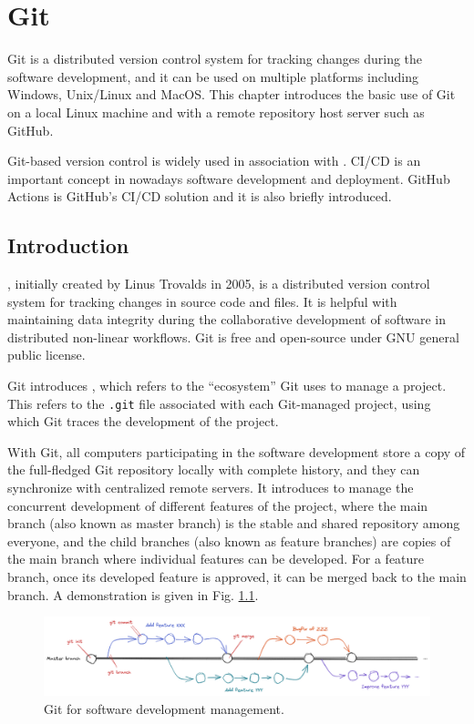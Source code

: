 \chapter{Git} \label{ch:git}

Git is a distributed version control system for tracking changes during the software development, and it can be used on multiple platforms including Windows, Unix/Linux and MacOS. This chapter introduces the basic use of Git on a local Linux machine and with a remote repository host server such as GitHub. 

Git-based version control is widely used in association with . CI/CD is an important concept in nowadays software development and deployment. GitHub Actions is GitHub's CI/CD solution and it is also briefly introduced.

\section{Introduction}

, initially created by Linus Trovalds in 2005, is a distributed version control system for tracking changes in source code and files. It is helpful with maintaining data integrity during the collaborative development of software in distributed non-linear workflows. Git is free and open-source under GNU general public license.

Git introduces , which refers to the ``ecosystem'' Git uses to manage a project. This refers to the \verb|.git| file associated with each Git-managed project, using which Git traces the development of the project. 

With Git, all computers participating in the software development store a copy of the full-fledged Git repository locally with complete history, and they can synchronize with centralized remote servers. It introduces  to manage the concurrent development of different features of the project, where the main branch (also known as master branch) is the stable and shared repository among everyone, and the child branches (also known as feature branches) are copies of the main branch where individual features can be developed. For a feature branch, once its developed feature is approved, it can be merged back to the main branch. A demonstration is given in Fig. \ref{ch:sma:fig:gitflow}.
\begin{figure}[htbp]
	\centering
	\includegraphics[width=350pt]{chapters/part-3/figures/gitflow.png}
	\caption{Git for software development management.} \label{ch:sma:fig:gitflow}
\end{figure}

